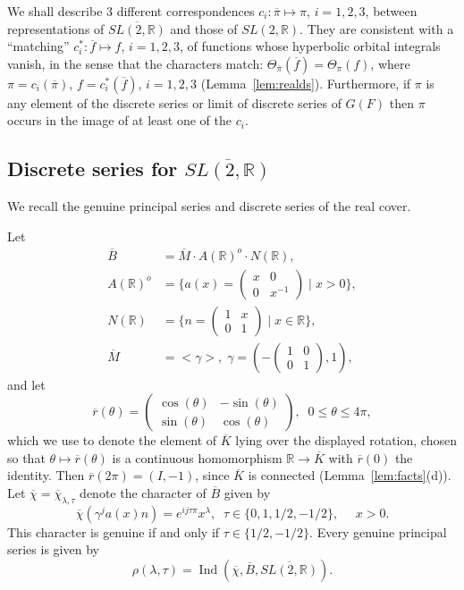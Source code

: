 \documentclass[12pt,letterpaper]{book}
\theoremstyle{plain}
\theoremstyle{definition}
\theoremstyle{remark}
\theoremstyle{remark}
\begin{document}
We shall describe 3 different correspondences
$c_i:\overline{\pi}\longmapsto \pi$, $i=1,2,3$, between representations of
$\overline{SL(2,\mathbb{R})}$ and those of $SL(2,\mathbb{R})$. They are
consistent with a ``matching'' $c_i^*:\overline{f}\longmapsto f$,
$i=1,2,3$, of functions whose hyperbolic orbital integrals vanish, in the
sense that the characters match:
$\Theta_{\overline{\pi}}(\overline{f})=\Theta_{\pi}(f)$, where
$\pi=c_i(\overline{\pi})$, $f=c_i^*(\overline{f})$, $i=1,2,3$
(Lemma~\ref{lem:realds}).
Furthermore, if $\pi$ is any element of the discrete series or limit of
discrete series of $G(F)$ then $\pi$ occurs in the image of at least one
of the $c_i$.

\subsection{Discrete series for \texorpdfstring{$\overline{SL(2,\mathbb{R})}$}{SL(2,R)-bar}}

We recall the genuine principal series and discrete series of the real cover.


Let
\begin{align*}
\overline{B} &=\overline{M}\cdot A(\mathbb{R})^o\cdot N(\mathbb{R}), \\
A(\mathbb{R})^o &=\{a(x)=\left(
\begin{array}{cc}
x & 0 \\
0 & x^{-1}
\end{array}
\right) \;|\;x>0\}, \\
N(\mathbb{R}) &=\{n=\left(
\begin{array}{cc}
1 & x \\
0 & 1
\end{array}
\right) \;|\;x\in \mathbb{R}\}, \\
\overline{M} &=<\gamma >,\;\gamma =(-\left(
\begin{array}{cc}
1 & 0 \\
0 & 1
\end{array}
\right) ,1),
\end{align*}
and let
\[
\overline{r}(\theta )=\left(
\begin{array}{cc}
\cos (\theta ) & -\sin (\theta ) \\
\sin (\theta ) & \cos (\theta )
\end{array}
\right) ,\;\;0\leq \theta \leq 4\pi ,
\]
which we use to denote the element of $\overline{K}$ lying over the
displayed rotation, chosen so that $\theta\mapsto\overline r(\theta)$ is a
continuous homomorphism ${\mathbb R}\rightarrow\overline K$ with
$\overline r(0)$ the identity. Then $\overline r(2\pi)=(I,-1)$, since
$\overline K$ is connected (Lemma~\ref{lem:facts}(d)).
Let $\overline{\chi }=\overline{\chi }_{\lambda ,\tau }$ denote the
character of $\overline{B}$ given by
\[
\overline{\chi }(\gamma ^ja(x)n)=e^{ij\tau \pi }x^\lambda ,\;\;\tau \in
\{0,1,1/2,-1/2\},\ \ \ \ \ \ x>0.
\]
This character is genuine if and only if $\tau \in \{1/2,-1/2\}$. Every
genuine principal series is given by
\[
\rho (\lambda ,\tau )=\operatorname{Ind}(\overline{\chi },\overline{B},\overline{SL(2,\mathbb{R%
})}).
\]
\end{document}
